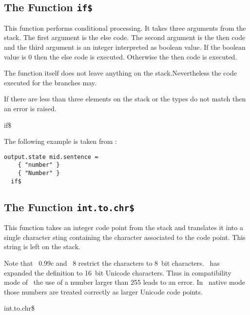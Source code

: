 \subsection{The Function \texttt{if\$}}%

This function performs conditional processing. It takes three
arguments from the stack. The first argument is the else code. The
second argument is the then code and the third argument is an integer
interpreted as boolean value. If the boolean value is 0 then the else
code is executed. Otherwise the then code is executed.

The function itself does not leave anything on the stack.Nevertheless
the code executed for the branches may.

If there are less than three elements on the stack or the types do not
match then an error is raised.

\begin{BstFunction}{if\$}
\end{BstFunction}

The following example is taken from :

\begin{lstlisting}[language=bst]
    output.state mid.sentence =
    { "number" }
    { "Number" }
  if$
\end{lstlisting}

\subsection{The Function \texttt{int.to.chr\$}}%

This function takes an integer code point from the stack and
translates it into a single character sting containing the character
associated to the code point. This string is left on the stack.

Note that \BibTeX~0.99c and
\BibTeX~8 restrict the characters to 8~bit
characters. \ExBib\ has expanded the definition to 16~bit
Unicode characters. Thus in compatibility mode of
\ExBib\ the use of a number larger than 255 leads to an error. In
\ExBib\ native mode those numbers are treated correctly as larger
Unicode code points.

\begin{BstFunction}{int.to.chr\$}
\end{BstFunction}

